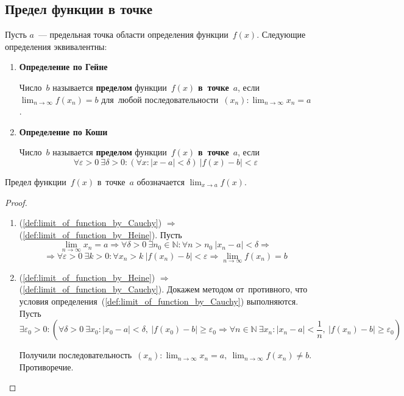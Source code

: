 \subsection{Предел функции в точке}
Пусть $a$~--- предельная точка области определения функции~$f(x)$.
Следующие определения эквивалентны:
\begin{enumerate}
	\item\label{def:limit_of_function_by_Heine}\textbf{Определение по Гейне}
	
	Число~$b$ называется \textbf{пределом} функции~$f(x)$ \textbf{в~точке}~$a$, если $\displaystyle \lim_{n \to \infty} f(x_n) = b$ для~любой последовательности~$\displaystyle (x_n): \lim_{n \to \infty} x_n = a$.
	
	\item\label{def:limit_of_function_by_Cauchy}\textbf{Определение по Коши}
	
	Число~$b$ называется \textbf{пределом} функции~$f(x)$ \textbf{в~точке}~$a$, если
	\begin{equation*}
	\forall \varepsilon > 0 \ \exists \delta > 0 \colon (\forall x \colon |x - a| < \delta) \ |f(x) - b| < \varepsilon
	\end{equation*}
\end{enumerate}

Предел функции~$f(x)$ в~точке~$a$ обозначается $\displaystyle \lim_{x \to a} f(x)$.
\begin{proof}
\begin{enumerate}
	\item (\ref{def:limit_of_function_by_Cauchy}) $\Rightarrow$ (\ref{def:limit_of_function_by_Heine}).
	Пусть 
	\begin{equation*}
	\lim_{n \to \infty} x_n = a \Rightarrow
	\forall \delta > 0 \ \exists n_0 \in \mathbb N \colon \forall n > n_0 \ |x_n - a| < \delta \Rightarrow
	\end{equation*}
	\begin{equation*}
	\Rightarrow \forall \varepsilon > 0 \ \exists k > 0 \colon \forall x_n > k \ |f(x_n) - b| < \varepsilon \Rightarrow
	\lim_{n \to \infty} f(x_n) = b
	\end{equation*}
	
	\item (\ref{def:limit_of_function_by_Heine}) $\Rightarrow$ (\ref{def:limit_of_function_by_Cauchy}).
	Докажем методом от~противного, что условия определения~(\ref{def:limit_of_function_by_Cauchy}) выполняются.
	Пусть 
	\begin{equation*}
	\exists \varepsilon_0 > 0 \colon (\forall \delta > 0 \ \exists x_0 \colon |x_0 - a| < \delta, \ |f(x_0) - b| \geqslant \varepsilon_0 \Rightarrow
	\forall n \in \mathbb N \ \exists x_n \colon |x_n - a| < \frac1n, \ |f(x_n) - b| \geqslant \varepsilon_0)
	\end{equation*}
	
	Получили последовательность~$\displaystyle (x_n) \colon \lim_{n \to \infty} x_n = a, \ \lim_{n \to \infty} f(x_n) \neq b$.
	Противоречие.
\end{enumerate}
\end{proof}

